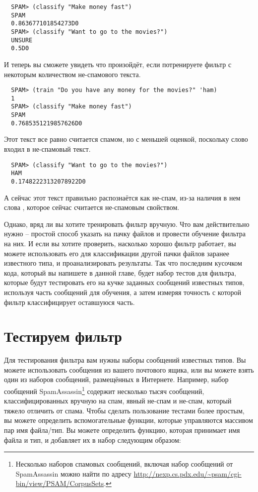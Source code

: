 \begin{verbatim}
  SPAM> (classify "Make money fast")
  SPAM
  0.863677101854273D0
  SPAM> (classify "Want to go to the movies?")
  UNSURE
  0.5D0
\end{verbatim}

И теперь вы сможете увидеть что произойдёт, если потренируете фильтр с некоторым
количеством не-спамового текста.

\begin{verbatim}
  SPAM> (train "Do you have any money for the movies?" 'ham)
  1
  SPAM> (classify "Make money fast")
  SPAM
  0.7685351219857626D0
\end{verbatim}

Этот текст все равно считается спамом, но с меньшей оценкой, поскольку слово 
входил в не-спамовый текст.

\begin{verbatim}
  SPAM> (classify "Want to go to the movies?")
  HAM
  0.17482223132078922D0
\end{verbatim}

А сейчас этот текст правильно распознаётся как не-спам, из-за наличия в нем слова
, которое сейчас считается не-спамовым свойством.

Однако, вряд ли вы хотите тренировать фильтр вручную.  Что вам действительно нужно --
простой способ указать на пачку файлов и провести обучение фильтра на них.  И если вы
хотите проверить, насколько хорошо фильтр работает, вы можете использовать его для
классификации другой пачки файлов заранее известного типа, и проанализировать результаты.
Так что последним кусочком кода, который вы напишете в данной главе, будет набор тестов
для фильтра, которые будут тестировать его на кучке заданных сообщений известных типов,
используя часть сообщений для обучения, а затем измеряя точность с которой фильтр
классифицирует оставшуюся часть.

\section{Тестируем фильтр}

Для тестирования фильтра вам нужны наборы сообщений известных типов.  Вы можете
использовать сообщения из вашего почтового ящика, или вы можете взять один из наборов
сообщений, размещённых в Интернете.  Например, набор сообщений
SpamAssassin\footnote{Несколько наборов спамовых сообщений, включая набор сообщений от
  SpamAssassin можно найти по адресу
  \url{http://nexp.cs.pdx.edu/~psam/cgi-bin/view/PSAM/CorpusSets}.} содержит несколько
тысяч сообщений, классифицированных вручную на спам, явный не-спам и не-спам, который
тяжело отличить от спама.  Чтобы сделать пользование тестами более простым, вы можете
определить вспомогательные функции, которые управляются массивом пар имя файла/тип.  Вы
можете определить функцию, которая принимает имя файла и тип, и добавляет их в набор
следующим образом:

